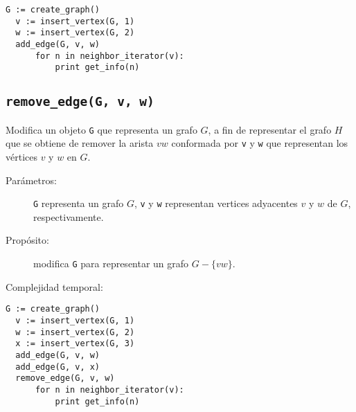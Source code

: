 \documentclass[a4paper,12pt]{article}
\makeatletter
\newcommand{\Code}[1]{\lstinline[basicstyle={\tt}]@#1@}
\makeatother
\begin{document}
\begin{lstlisting}[caption={Ejemplo de uso de add\_edge. El código crea un grafo $G$ con dos vértices, el primero \texttt{v} representa al vértice $v$ con el número 1 y el segundo \texttt{w} representa al vértice $w$ con el número 2 como infomación. Luego, crea la arista $vw$ entre estos dos vertices dentro del grafo $G$. El ciclo imprime cada uno de los valores de los vecinos de $v$, en este caso como $w$ es su único vecino imprime ``2''. Ver Sección~\ref{sec:tad grafo:neighbor-iterator} para más información de \texttt{neghbor\_iterator}.},gobble=2,float=ht,label={lst:pseudo:add_edge},emph={add_edge}]
  G := create_graph()
  v := insert_vertex(G, 1)
  w := insert_vertex(G, 2)
  add_edge(G, v, w)
      for n in neighbor_iterator(v):
          print get_info(n)
\end{lstlisting}


\subsection{\texttt{remove\_edge(G, v, w)}}
\label{sec:tad grafo:remove-edge}

Modifica un objeto \Code{G} que representa un grafo $G$, a fin de representar el grafo $H$ que se obtiene de remover la arista $vw$ conformada por \Code{v} y \Code{w} que representan los vértices $v$ y $w$ en $G$.

\begin{description}
  \item [Parámetros:] \Code{G} representa un grafo $G$, \Code{v} y \Code{w} representan vertices adyacentes $v$ y $w$ de $G$, respectivamente.
  \item [Propósito:] modifica \Code{G} para representar un grafo $G - \{vw\}$.
  \item [Complejidad temporal:]
\end{description}


\begin{lstlisting}[caption={Ejemplo de uso de \Code{remove_edge}.  En el código se crea un grafo $G$ con vértices $v$, $w$ y $x$, siendo $v$ adyacente tanto a $w$ como a $x$.  Luego se utiliza \Code{remove_edge} para eliminar la arista $vw$, con lo cual $v$ queda adyacente únicamente a $x$.  El ciclo final, pues, imprime el valor $3$ asociado a $x$.  Ver Sección~\ref{sec:tad grafo:neighbor-iterator} para más información de \Code{neghbor_iterator}.},gobble=2,float=ht,label={lst:pseudo:remove_edge},emph={remove_edge}]
  G := create_graph()
  v := insert_vertex(G, 1)
  w := insert_vertex(G, 2)
  x := insert_vertex(G, 3)
  add_edge(G, v, w)
  add_edge(G, v, x)
  remove_edge(G, v, w)
      for n in neighbor_iterator(v):
          print get_info(n)
\end{lstlisting}
\end{document}
